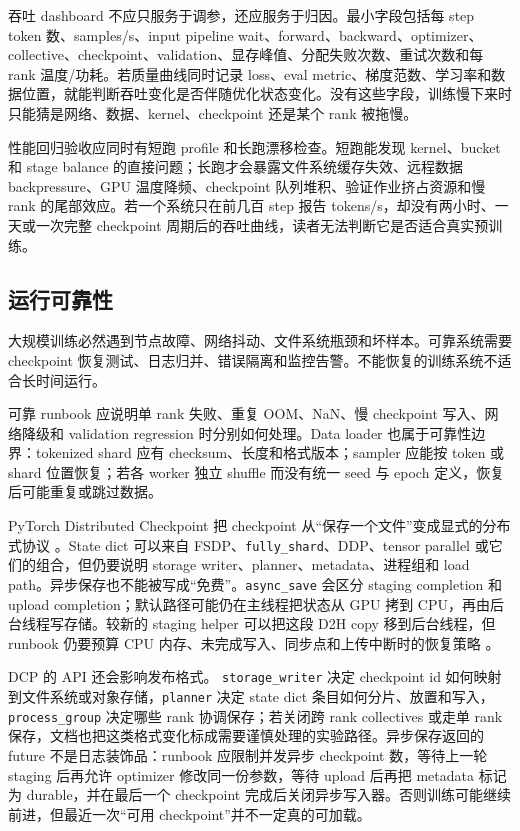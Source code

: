 \documentclass[UTF8,zihao=-4,openany]{ctexbook}
\begin{document}
吞吐 dashboard 不应只服务于调参，还应服务于归因。最小字段包括每 step token 数、samples/s、input pipeline wait、forward、backward、optimizer、collective、checkpoint、validation、显存峰值、分配失败次数、重试次数和每 rank 温度/功耗。若质量曲线同时记录 loss、eval metric、梯度范数、学习率和数据位置，就能判断吞吐变化是否伴随优化状态变化。没有这些字段，训练慢下来时只能猜是网络、数据、kernel、checkpoint 还是某个 rank 被拖慢。

性能回归验收应同时有短跑 profile 和长跑漂移检查。短跑能发现 kernel、bucket 和 stage balance 的直接问题；长跑才会暴露文件系统缓存失效、远程数据 backpressure、GPU 温度降频、checkpoint 队列堆积、验证作业挤占资源和慢 rank 的尾部效应。若一个系统只在前几百 step 报告 tokens/s，却没有两小时、一天或一次完整 checkpoint 周期后的吞吐曲线，读者无法判断它是否适合真实预训练。

\subsection{运行可靠性}
大规模训练必然遇到节点故障、网络抖动、文件系统瓶颈和坏样本。可靠系统需要 checkpoint 恢复测试、日志归并、错误隔离和监控告警。不能恢复的训练系统不适合长时间运行。

可靠 runbook 应说明单 rank 失败、重复 OOM、NaN、慢 checkpoint 写入、网络降级和 validation regression 时分别如何处理。Data loader 也属于可靠性边界：tokenized shard 应有 checksum、长度和格式版本；sampler 应能按 token 或 shard 位置恢复；若各 worker 独立 shuffle 而没有统一 seed 与 epoch 定义，恢复后可能重复或跳过数据。

PyTorch Distributed Checkpoint 把 checkpoint 从“保存一个文件”变成显式的分布式协议 \cite{pytorch2026distributedcheckpoint}。State dict 可以来自 FSDP、\texttt{fully\_shard}、DDP、tensor parallel 或它们的组合，但仍要说明 storage writer、planner、metadata、进程组和 load path。异步保存也不能被写成“免费”。\texttt{async\_save} 会区分 staging completion 和 upload completion；默认路径可能仍在主线程把状态从 GPU 拷到 CPU，再由后台线程写存储。较新的 staging helper 可以把这段 D2H copy 移到后台线程，但 runbook 仍要预算 CPU 内存、未完成写入、同步点和上传中断时的恢复策略 \cite{pytorch2026asynccheckpoint}。

DCP 的 API 还会影响发布格式。 \texttt{storage\_writer} 决定 checkpoint id 如何映射到文件系统或对象存储，\texttt{planner} 决定 state dict 条目如何分片、放置和写入，\texttt{process\_group} 决定哪些 rank 协调保存；若关闭跨 rank collectives 或走单 rank 保存，文档也把这类格式变化标成需要谨慎处理的实验路径。异步保存返回的 future 不是日志装饰品：runbook 应限制并发异步 checkpoint 数，等待上一轮 staging 后再允许 optimizer 修改同一份参数，等待 upload 后再把 metadata 标记为 durable，并在最后一个 checkpoint 完成后关闭异步写入器。否则训练可能继续前进，但最近一次“可用 checkpoint”并不一定真的可加载。
\end{document}
